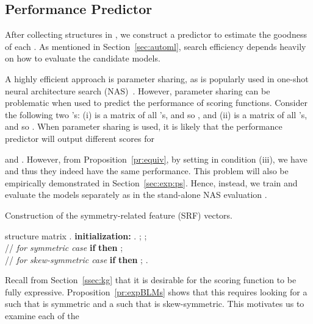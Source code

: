 \documentclass[10pt,journal,compsoc]{IEEEtran}
\begin{document}
\subsection{Performance Predictor}
\label{sssec:predictor}


After collecting  structures 
in , 
we construct a predictor  to estimate the goodness of each 
.
As mentioned in Section~\ref{sec:automl}, 
search efficiency depends heavily on  how to 
evaluate the candidate models.

A highly efficient approach is parameter sharing, 
as is popularly used in
one-shot neural architecture search (NAS)~\cite{pham2018efficient,liu2018darts}.
However,
parameter sharing
can be problematic
when used to predict the performance 
of scoring functions.
Consider 
the following two 
's: (i)
 is a  matrix of all 's, and so , and
(ii)
 is a  matrix of all 's, and so .
When parameter sharing is used, it is likely that the performance predictor will output different
scores for
 
and .
However, 
from 
Proposition~\ref{pr:equiv},
by setting 
in condition (iii),
we have
 and thus they indeed have the same performance.
This problem 
will also be empirically demonstrated in Section~\ref{sec:exp:ps}.
Hence, instead,
we train and evaluate the models separately as in the 
stand-alone NAS evaluation 
\cite{zoph2017neural,liu2018progressive}.

\begin{algorithm}[ht]
	\caption{Construction of the symmetry-related feature (SRF) vectors.}
	\small
	\label{alg:srf}
	\begin{algorithmic}[1]
		\REQUIRE structure matrix .
		\STATE \textbf{initialization:} .
		\FOR{}
		\IF{}
		\STATE ;
		\STATE ;
		\\ // \textit{for symmetric case}
		\STATE \textbf{if} {} 
		\textbf{then} ; \label{step:srf:sym}
		\\ // \textit{for skew-symmetric case}
		\STATE \textbf{if} {} 
		\textbf{then} ;  \label{step:srf:ssym}
		\ENDIF
		\ENDFOR
		\RETURN .
	\end{algorithmic}
\end{algorithm}

Recall  from Section~\ref{ssec:kg}
that 
it is desirable for
the scoring function
to be fully expressive.
Proposition~\ref{pr:expBLMs} shows that this requires looking for 
a  
such that  is symmetric and
a  
such that  is skew-symmetric.
This motivates us to examine 
each of the 
 
\end{document}
